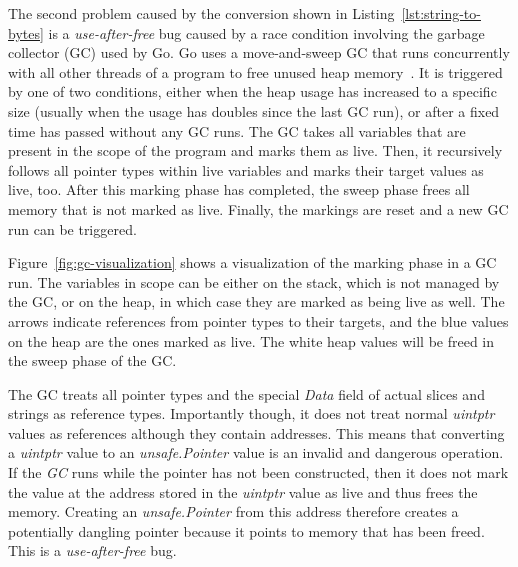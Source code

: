 The second problem caused by the conversion shown in Listing~\ref{lst:string-to-bytes} is a \textit{use-after-free} bug
caused by a race condition involving the garbage collector (\acrshort{GC}) used by Go.
Go uses a move-and-sweep GC that runs concurrently with all other threads of a program to free unused heap
memory~\cite{sibiryov2017}.
It is triggered by one of two conditions, either when the heap usage has increased to a specific size (usually when the
usage has doubles since the last \acrshort{GC} run), or after a fixed time has passed without any \acrshort{GC} runs.
The \acrshort{GC} takes all variables that are present in the scope of the program and marks them as live.
Then, it recursively follows all pointer types within live variables and marks their target values as live, too.
After this marking phase has completed, the sweep phase frees all memory that is not marked as live.
Finally, the markings are reset and a new \acrshort{GC} run can be triggered.

Figure~\ref{fig:gc-visualization} shows a visualization of the marking phase in a \acrshort{GC} run.
The variables in scope can be either on the stack, which is not managed by the \acrshort{GC}, or on the heap, in which
case they are marked as being live as well.
The arrows indicate references from pointer types to their targets, and the blue values on the heap are the ones marked
as live.
The white heap values will be freed in the sweep phase of the \acrshort{GC}.



The \acrshort{GC} treats all pointer types and the special \textit{Data} field of actual slices and strings as reference
types.
Importantly though, it does not treat normal \textit{uintptr} values as references although they contain addresses.
This means that converting a \textit{uintptr} value to an \textit{unsafe.Pointer} value is an invalid and dangerous
operation.
If the \textit{GC} runs while the pointer has not been constructed, then it does not mark the value at the address
stored in the \textit{uintptr} value as live and thus frees the memory.
Creating an \textit{unsafe.Pointer} from this address therefore creates a potentially dangling pointer because it points
to memory that has been freed.
This is a \textit{use-after-free} bug.


